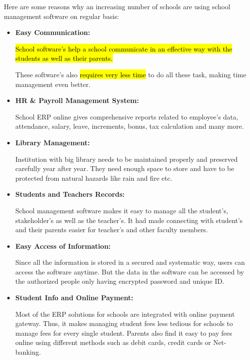 \documentclass[12pt, a4paper]{article}
\begin{document}
Here are some reasons why an increasing number of schools are using school
management software on regular basis:
\begin{itemize}
  \item \textbf{Easy Communication:}

    \hl{School software's help a school communicate in an effective way with
    the students as well as their parents.}

    These software's also \hl{requires very less time} to do all these task,
    making time management even better.

  \item \textbf{HR \& Payroll Management System:}

    School ERP online gives comprehensive reports related to employee’s data,
    attendance, salary, leave, increments, bonus, tax calculation and many
    more.

  \item \textbf{Library Management:}

    Institution with big library needs to be maintained properly and preserved
    carefully year after year. They need enough space to store and have to be
    protected from natural hazards like rain and fire etc.

  \item \textbf{Students and Teachers Records:}

    School management software makes it easy to manage all the student's,
    stakeholder's as well as the teacher's. It had made connecting with 
    student's and their parents easier for teacher's and other faculty
    members.

  \item \textbf{Easy Access of Information:}

    Since all the information is stored in a secured and systematic way, users
    can access the software anytime. But the data in the software can be
    accessed by the authorized people only having encrypted password and
    unique ID.

  \item \textbf{Student Info and Online Payment:}

    Most of the ERP solutions for schools are integrated with online payment
    gateway. Thus, it makes managing student fees less tedious for schools to 
    manage fees for every single student. Parents also find it easy to pay 
    fees online using different methods such as debit cards, credit cards or 
    Net-banking.
\end{itemize}
\end{document}
